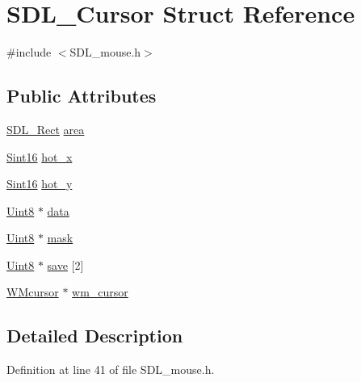 \hypertarget{struct_s_d_l___cursor}{}\section{S\+D\+L\+\_\+\+Cursor Struct Reference}
\label{struct_s_d_l___cursor}


{\ttfamily \#include $<$S\+D\+L\+\_\+mouse.\+h$>$}

\subsection*{Public Attributes}
\begin{DoxyCompactItemize}
\item 
\hyperlink{struct_s_d_l___rect}{S\+D\+L\+\_\+\+Rect} \hyperlink{struct_s_d_l___cursor_afefd14bbad7b59dbf22d63352ced7378}{area}
\item 
\hyperlink{_s_d_l__stdinc_8h_a9d0257032c0e146ab6121bf0122712f5}{Sint16} \hyperlink{struct_s_d_l___cursor_a9560ccf14c4b7eb5dd905c6af57ba3e1}{hot\+\_\+x}
\item 
\hyperlink{_s_d_l__stdinc_8h_a9d0257032c0e146ab6121bf0122712f5}{Sint16} \hyperlink{struct_s_d_l___cursor_a154ec5999705b912aa09b1f1bacb3275}{hot\+\_\+y}
\item 
\hyperlink{_s_d_l__stdinc_8h_a2944638813a090aa23e62f4da842c3e2}{Uint8} $\ast$ \hyperlink{struct_s_d_l___cursor_ae7f8c81028205f9359f0171f2a82ec04}{data}
\item 
\hyperlink{_s_d_l__stdinc_8h_a2944638813a090aa23e62f4da842c3e2}{Uint8} $\ast$ \hyperlink{struct_s_d_l___cursor_afaec3f604b8a83986bab02eee024c5eb}{mask}
\item 
\hyperlink{_s_d_l__stdinc_8h_a2944638813a090aa23e62f4da842c3e2}{Uint8} $\ast$ \hyperlink{struct_s_d_l___cursor_a44a8edebf057e76e048512a57c5630e0}{save} \mbox{[}2\mbox{]}
\item 
\hyperlink{_s_d_l__mouse_8h_a8acd11965ec83b75723cc1f5e0d9c5c2}{W\+Mcursor} $\ast$ \hyperlink{struct_s_d_l___cursor_ab133c48a66abe3831e5ad18467d9ef3d}{wm\+\_\+cursor}
\end{DoxyCompactItemize}


\subsection{Detailed Description}


Definition at line 41 of file S\+D\+L\+\_\+mouse.\+h.



